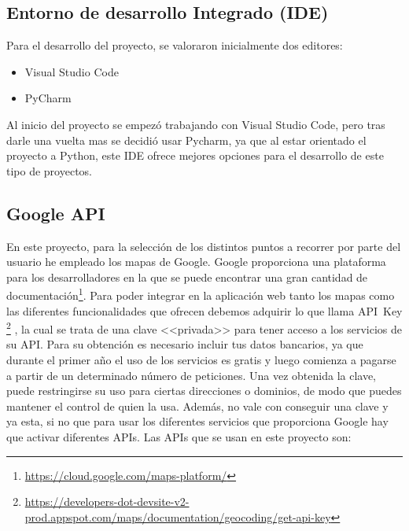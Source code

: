 \subsection{Entorno de desarrollo Integrado (IDE)}
Para el desarrollo del proyecto, se valoraron inicialmente dos editores:
\begin{itemize}
	\item Visual Studio Code
	\item PyCharm
\end{itemize}
Al inicio del proyecto se empezó trabajando con Visual Studio Code, pero tras darle una vuelta mas se decidió usar Pycharm, ya que al estar orientado el proyecto a Python, este IDE ofrece mejores opciones para el desarrollo de este tipo de proyectos.


\subsection{Google API}
En este proyecto, para la selección de los distintos puntos a recorrer por parte del usuario he empleado los mapas de Google. Google proporciona una plataforma para los desarrolladores en la que se puede encontrar una gran cantidad de documentación\footnote{\url{https://cloud.google.com/maps-platform/}}.
Para poder integrar en la aplicación web tanto los mapas como las diferentes funcionalidades que ofrecen debemos adquirir lo que llama API~Key \footnote{\url{https://developers-dot-devsite-v2-prod.appspot.com/maps/documentation/geocoding/get-api-key}} , la cual se trata de una clave <<privada>> para tener acceso a los servicios de su API. Para su obtención es necesario incluir tus datos bancarios, ya que durante el primer año el uso de los servicios es gratis y luego comienza a pagarse a partir de un determinado número de peticiones.
Una vez obtenida la clave, puede restringirse su uso para ciertas direcciones o dominios, de modo que puedes mantener el control de quien la usa. Además, no vale con conseguir una clave y ya esta, si no que para usar los diferentes servicios que proporciona Google hay que activar diferentes APIs.
Las APIs que se usan en este proyecto son:

